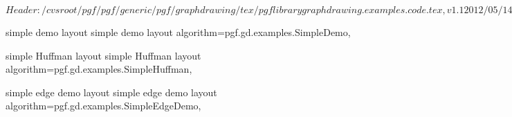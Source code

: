 %
%
%

\ProvidesFileRCS[v\pgfversion] $Header: /cvsroot/pgf/pgf/generic/pgf/graphdrawing/tex/pgflibrarygraphdrawing.examples.code.tex,v 1.1 2012/05/14 10:27:48 tantau Exp $


%
%

\pgfgddeclarealgorithmkey
  {simple demo layout}
  {simple demo layout}
  {
    algorithm=pgf.gd.examples.SimpleDemo,
  }






%
%
%



\pgfgddeclarealgorithmkey
  {simple Huffman layout}
  {simple Huffman layout}
  {
    algorithm=pgf.gd.examples.SimpleHuffman,
  }


  
  
%
%


\pgfgddeclarealgorithmkey
  {simple edge demo layout}
  {simple edge demo layout}
  {
    algorithm=pgf.gd.examples.SimpleEdgeDemo,
  }



\endinput